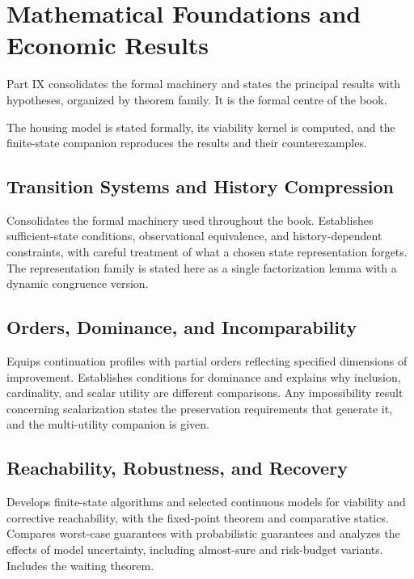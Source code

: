 \part{Mathematical Foundations and Economic Results}
\label{part:IX}

Part IX consolidates the formal machinery and states the principal results with hypotheses, organized by theorem family. It is the formal centre of the book.

\begin{housing}The housing model is stated formally, its viability kernel is computed, and the finite-state companion reproduces the results and their counterexamples.\end{housing}

\chapter{Transition Systems and History Compression}\label{ch:41}
Consolidates the formal machinery used throughout the book. Establishes sufficient-state conditions, observational equivalence, and history-dependent constraints, with careful treatment of what a chosen state representation forgets. The representation family is stated here as a single factorization lemma with a dynamic congruence version.
\scaffold

\chapter{Orders, Dominance, and Incomparability}\label{ch:42}
Equips continuation profiles with partial orders reflecting specified dimensions of improvement. Establishes conditions for dominance and explains why inclusion, cardinality, and scalar utility are different comparisons. Any impossibility result concerning scalarization states the preservation requirements that generate it, and the multi-utility companion is given.
\scaffold

\chapter{Reachability, Robustness, and Recovery}\label{ch:43}
Develops finite-state algorithms and selected continuous models for viability and corrective reachability, with the fixed-point theorem and comparative statics. Compares worst-case guarantees with probabilistic guarantees and analyzes the effects of model uncertainty, including almost-sure and risk-budget variants. Includes the waiting theorem.
\scaffold

